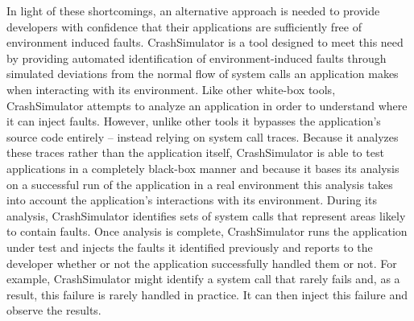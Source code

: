     In light of these shortcomings, an alternative approach is needed to provide developers with confidence that their
    applications are sufficiently free of environment induced faults.  CrashSimulator is a tool designed to meet this
    need by providing automated identification of environment-induced faults through simulated deviations from the
    normal flow of system calls an application makes when interacting with its environment. Like other white-box tools,
    CrashSimulator attempts to analyze an application in order to understand where it can inject faults.  However,
    unlike other tools it bypasses the application's source code entirely -- instead relying on system call traces.
    Because it analyzes these traces rather than the application itself, CrashSimulator is able to test applications in
    a completely black-box manner and because it bases its analysis on a successful run of the application in a real
    environment this analysis takes into account the application's interactions with its environment. During its
    analysis, CrashSimulator identifies sets of system calls that represent areas likely to contain faults. Once
    analysis is complete, CrashSimulator runs the application under test and injects the faults it identified previously
    and reports to the developer whether or not the application successfully handled them or not. For example,
    CrashSimulator might identify a system call that rarely fails and, as a result, this failure is rarely handled in
    practice. It can then inject this failure and observe the results.
